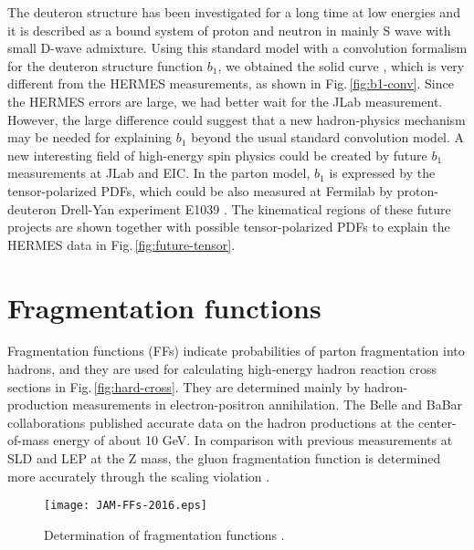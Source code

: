 \documentclass{PoS}
\begin{document}
The deuteron structure has been investigated
for a long time at low energies and it is described as a bound system
of proton and neutron in mainly S wave with small D-wave admixture.
Using this standard model with a convolution formalism for the deuteron
structure function $b_1$, we obtained the solid curve \cite{b1-conv}, which is very
different from the HERMES measurements, as shown in Fig.\,\ref{fig:b1-conv}.
Since the HERMES errors are large, we had better wait for the JLab measurement. 
However, the large difference could suggest that a new hadron-physics
mechanism may be needed for explaining $b_1$ beyond the usual
standard convolution model. A new interesting field of high-energy 
spin physics could be created by future $b_1$ measurements at JLab
and EIC. In the parton model, $b_1$ is expressed by the tensor-polarized
PDFs, which could be also measured at Fermilab by proton-deuteron
Drell-Yan experiment E1039 \cite{jlab-b1-fermilab}.
The kinematical regions of these future projects are shown together
with possible tensor-polarized PDFs to explain the HERMES data
\cite{sk-tensor} in Fig.\,\ref{fig:future-tensor}. 

\vfill\eject
\section{Fragmentation functions}
\label{ffs}

Fragmentation functions (FFs) indicate probabilities of parton fragmentation
into hadrons, and they are used for calculating high-energy hadron 
reaction cross sections in Fig.\,\ref{fig:hard-cross}.
They are determined mainly by hadron-production measurements in electron-positron
annihilation. The Belle and BaBar collaborations published accurate data 
on the hadron productions at the center-of-mass energy
of about 10 GeV. In comparison with previous measurements at SLD and LEP
at the Z mass, the gluon fragmentation function is determined more
accurately through the scaling violation \cite{HKKS-2016}.

\begin{wrapfigure}[12]{r}{0.55\textwidth}
   \vspace{-0.6cm} 
   \begin{center}
     \texttt{[image: JAM-FFs-2016.eps]}
   \end{center}
\vspace{-0.80cm}
\caption{Determination of fragmentation functions \cite{JAM-FFs-2016}.}
\label{fig:JAM-FFs-2016}
\vspace{-0.60cm}
\end{wrapfigure}
\end{document}
